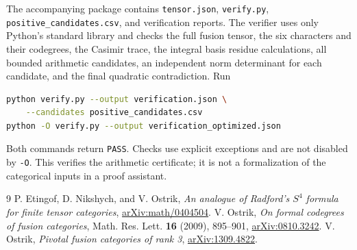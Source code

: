 \documentclass[11pt]{article}
\numberwithin{equation}{section}
\begin{document}
The accompanying package contains \texttt{tensor.json},
\texttt{verify.py}, \texttt{positive\_candidates.csv}, and verification reports.
The verifier uses only Python's standard library and checks the full fusion
tensor, the six characters and their codegrees, the Casimir trace, the integral
basis residue calculations, all bounded arithmetic candidates, an independent
norm determinant for each candidate, and the final quadratic contradiction.
Run
\begin{lstlisting}[language=bash]
python verify.py --output verification.json \
    --candidates positive_candidates.csv
python -O verify.py --output verification_optimized.json
\end{lstlisting}
Both commands return \texttt{PASS}. Checks use explicit exceptions and are not
disabled by \texttt{-O}. This verifies the arithmetic certificate; it is not a
formalization of the categorical inputs in a proof assistant.

\begin{thebibliography}{9}
P. Etingof, D. Nikshych, and V. Ostrik,
\emph{An analogue of Radford's $S^4$ formula for finite tensor categories},
\href{https://arxiv.org/abs/math/0404504}{arXiv:math/0404504}.
V. Ostrik, \emph{On formal codegrees of fusion categories},
Math. Res. Lett. \textbf{16} (2009), 895--901,
\href{https://arxiv.org/abs/0810.3242}{arXiv:0810.3242}.
V. Ostrik, \emph{Pivotal fusion categories of rank 3},
\href{https://arxiv.org/abs/1309.4822}{arXiv:1309.4822}.
\end{thebibliography}
\end{document}
